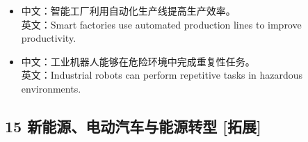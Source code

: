 \documentclass[a4paper,11pt,UTF8,fontset=none]{ctexart}
\begin{document}
\par

\begin{itemize}[leftmargin=1.7em,itemsep=1pt,parsep=0pt,topsep=2pt]
\item \noindent 中文：智能工厂利用自动化生产线提高生产效率。\\ 英文：Smart factories use automated production lines to improve productivity.\par


\item \noindent 中文：工业机器人能够在危险环境中完成重复性任务。\\ 英文：Industrial robots can perform repetitive tasks in hazardous environments.\par


\end{itemize}

\subsection{15 新能源、电动汽车与能源转型 {\color{AccentBlue} [拓展]}}
\end{document}
